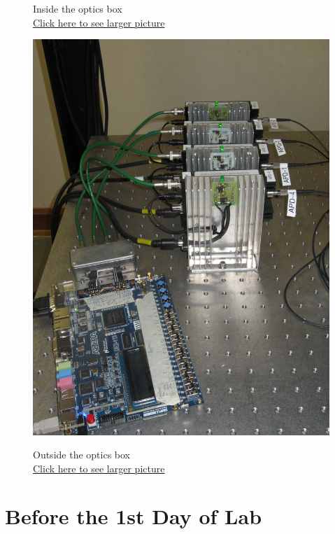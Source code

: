 \documentclass{../lab}
\begin{document}
\begin{figure}[H]
  \caption{Inside the optics box \\
  \href{http://experimentationlab.berkeley.edu/sites/default/files/images/QIE_0615.jpg}{Click here to see larger picture}}
  \label{fig:QIE_0615.jpg}
\endminipage\hfill
{}
  \href{http://experimentationlab.berkeley.edu/sites/default/files/images/QIE_APDs_0616.jpg}{\includegraphics[width=\linewidth,keepaspectratio]{images/QIE_APDs_0616.jpg}}
  \caption{Outside the optics box \\ \href{http://experimentationlab.berkeley.edu/sites/default/files/images/QIE_APDs_0616.jpg}{Click here to see larger picture}}\label{fig:QIE_APDs_0616.jpg}
\endminipage
\end{figure}

\section{Before the 1st Day of Lab}
\end{document}
